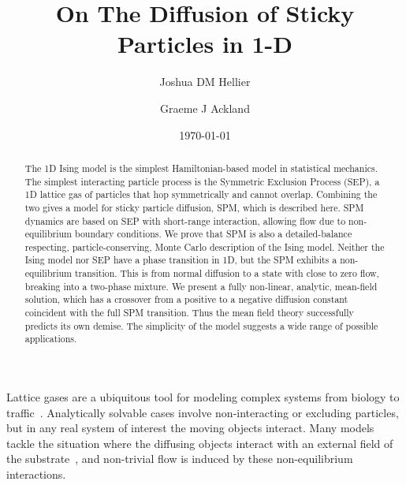 \documentclass[
reprint,
 amsmath,amssymb,
 aps,
 prl
]{revtex4-1}
\begin{document}
\title{On The Diffusion of Sticky Particles in 1-D}

\author{Joshua DM Hellier}
\author{Graeme J Ackland}

\date{\today}%

\begin{abstract}
The 1D Ising model is the simplest Hamiltonian-based model in
statistical mechanics. The simplest interacting particle process is
the Symmetric Exclusion Process (SEP), a 1D lattice gas of particles
that hop symmetrically and cannot overlap.  Combining the two gives a
model for sticky particle diffusion, SPM, which is described here.
SPM dynamics are based on SEP with short-range interaction, allowing
flow due to non-equilibrium boundary conditions.  We prove that SPM is
also a detailed-balance respecting, particle-conserving, Monte Carlo
description of the Ising model.  Neither the Ising model nor SEP have
a phase transition in 1D, but the SPM exhibits a non-equilibrium
transition.  This is from normal diffusion to a state with close to
zero flow, breaking into a two-phase mixture.  We present a fully
non-linear, analytic, mean-field solution, which has a crossover from
a positive to a negative diffusion constant coincident with the full SPM 
transition. Thus the mean field theory successfully predicts its own demise.
The simplicity of the model suggests a wide range of possible
applications.


\end{abstract}

\maketitle




Lattice gases are a ubiquitous tool for modeling complex systems from
biology to traffic~\cite{1742-5468-2011-07-P07007, Mobilia2007,
  tegner2015high, zhu2012atomic, DealGrove1965, MottCabrera1949,
  Buzzaccaro2007}.  Analytically solvable cases involve
non-interacting or excluding particles, but in any real system of
interest the moving objects interact. Many models tackle the situation
where the diffusing objects interact with an external field of the
substrate~\cite{ladd1988application, liggett1985interacting,
  BenNaim1999, Shandarin1989, Frachebourg1999, Frachebourg2000}, and
non-trivial flow is induced by these non-equilibrium interactions.  
\end{document}
